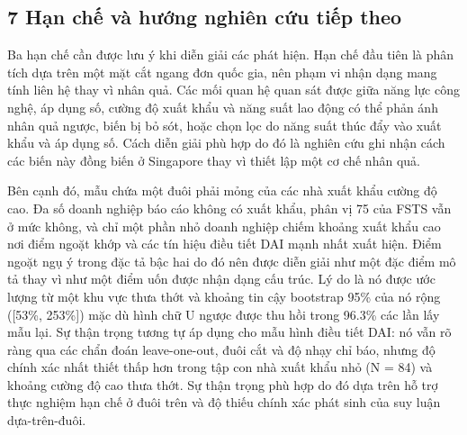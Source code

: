 \documentclass[12pt,a4paper]{article}
\begin{document}
\hypertarget{7-hux1ea1n-chux1ebf-vuxe0-hux1b0ux1edbng-nghiuxean-cux1ee9u-tiux1ebfp-theo}{%
\subsection{7 Hạn chế và hướng nghiên cứu tiếp
theo}\label{7-hux1ea1n-chux1ebf-vuxe0-hux1b0ux1edbng-nghiuxean-cux1ee9u-tiux1ebfp-theo}}

Ba hạn chế cần được lưu ý khi diễn giải các phát hiện. Hạn chế đầu tiên
là phân tích dựa trên một mặt cắt ngang đơn quốc gia, nên phạm vi nhận
dạng mang tính liên hệ thay vì nhân quả. Các mối quan hệ quan sát được
giữa năng lực công nghệ, áp dụng số, cường độ xuất khẩu và năng suất lao
động có thể phản ánh nhân quả ngược, biến bị bỏ sót, hoặc chọn lọc do
năng suất thúc đẩy vào xuất khẩu và áp dụng số. Cách diễn giải phù hợp
do đó là nghiên cứu ghi nhận cách các biến này đồng biến ở Singapore
thay vì thiết lập một cơ chế nhân quả.

Bên cạnh đó, mẫu chứa một đuôi phải mỏng của các nhà xuất khẩu cường độ
cao. Đa số doanh nghiệp báo cáo không có xuất khẩu, phân vị 75 của FSTS
vẫn ở mức không, và chỉ một phần nhỏ doanh nghiệp chiếm khoảng xuất khẩu
cao nơi điểm ngoặt khớp và các tín hiệu điều tiết DAI mạnh nhất xuất
hiện. Điểm ngoặt ngụ ý trong đặc tả bậc hai do đó nên được diễn giải như
một đặc điểm mô tả thay vì như một điểm uốn được nhận dạng cấu trúc. Lý
do là nó được ước lượng từ một khu vực thưa thớt và khoảng tin cậy
bootstrap 95\% của nó rộng ({[}53\%, 253\%{]}) mặc dù hình chữ U ngược
được thu hồi trong 96.3\% các lần lấy mẫu lại. Sự thận trọng tương tự áp
dụng cho mẫu hình điều tiết DAI: nó vẫn rõ ràng qua các chẩn đoán
leave-one-out, đuôi cắt và độ nhạy chỉ báo, nhưng độ chính xác nhất
thiết thấp hơn trong tập con nhà xuất khẩu nhỏ (N = 84) và khoảng cường
độ cao thưa thớt. Sự thận trọng phù hợp do đó dựa trên hỗ trợ thực
nghiệm hạn chế ở đuôi trên và độ thiếu chính xác phát sinh của suy luận
dựa-trên-đuôi.
\end{document}
